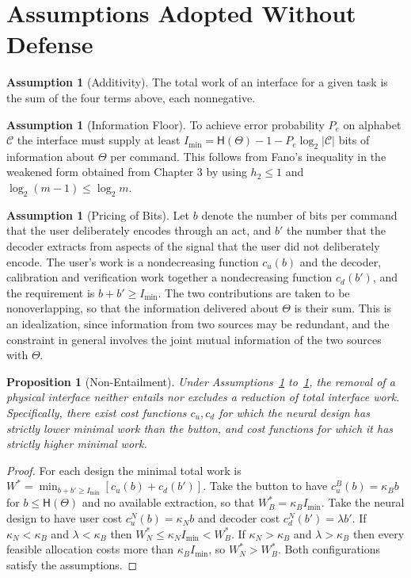 \documentclass[11pt,twoside,openany]{book}
\newtheorem{proposition}[theorem]{Proposition}
\theoremstyle{definition}
\newtheorem{assumption}[theorem]{Assumption}
\theoremstyle{remark}
\newcommand{\C}{\mathcal{C}}
\newcommand{\Hent}{\mathsf{H}}
\newcommand{\Th}{\Theta}
\begin{document}
\section{Assumptions Adopted Without Defense}

\begin{assumption}[Additivity]\label{as:add}
The total work of an interface for a given task is the sum of the four terms above, each nonnegative.
\end{assumption}
\begin{assumption}[Information Floor]\label{as:floor}
To achieve error probability $P_e$ on alphabet $\C$ the interface must supply at least $I_{\min}=\Hent(\Th)-1-P_e\log_2|\C|$ bits of information about $\Th$ per command. This follows from Fano's inequality in the weakened form obtained from Chapter 3 by using $h_2\le1$ and $\log_2(m-1)\le\log_2 m$.
\end{assumption}
\begin{assumption}[Pricing of Bits]\label{as:price}
Let $b$ denote the number of bits per command that the user deliberately encodes through an act, and $b'$ the number that the decoder extracts from aspects of the signal that the user did not deliberately encode. The user's work is a nondecreasing function $c_u(b)$ and the decoder, calibration and verification work together a nondecreasing function $c_d(b')$, and the requirement is $b+b'\ge I_{\min}$. The two contributions are taken to be nonoverlapping, so that the information delivered about $\Th$ is their sum. This is an idealization, since information from two sources may be redundant, and the constraint in general involves the joint mutual information of the two sources with $\Th$.
\end{assumption}

\begin{proposition}[Non-Entailment]\label{prop:nonentail}
Under Assumptions~\ref{as:add} to~\ref{as:price}, the removal of a physical interface neither entails nor excludes a reduction of total interface work. Specifically, there exist cost functions $c_u,c_d$ for which the neural design has strictly lower minimal work than the button, and cost functions for which it has strictly higher minimal work.
\end{proposition}
\begin{proof}
For each design the minimal total work is $W^{*}=\min_{b+b'\ge I_{\min}}\left[c_u(b)+c_d(b')\right]$. Take the button to have $c_u^{B}(b)=\kappa_B b$ for $b\le\Hent(\Th)$ and no available extraction, so that $W^{*}_B=\kappa_B I_{\min}$. Take the neural design to have user cost $c_u^{N}(b)=\kappa_N b$ and decoder cost $c_d^{N}(b')=\lambda b'$. If $\kappa_N<\kappa_B$ and $\lambda<\kappa_B$ then $W^{*}_N\le\kappa_N I_{\min}<W^{*}_B$. If $\kappa_N>\kappa_B$ and $\lambda>\kappa_B$ then every feasible allocation costs more than $\kappa_B I_{\min}$, so $W^{*}_N>W^{*}_B$. Both configurations satisfy the assumptions.
\end{proof}
\end{document}
